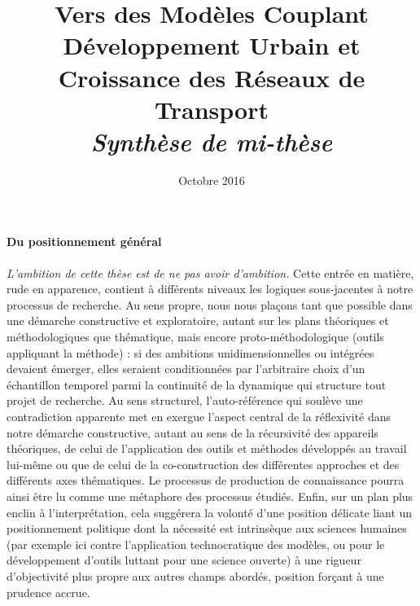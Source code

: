 




\title{Vers des Modèles Couplant Développement Urbain et Croissance des Réseaux de Transport\bigskip\\
\textit{Synthèse de mi-thèse}
}
\author{}
\date{Octobre 2016}


\maketitle

\justify


\begin{abstract}
\end{abstract}






\paragraph{Du positionnement général}

\emph{L'ambition de cette thèse est de ne pas avoir d'ambition.} Cette entrée en matière, rude en apparence, contient à différents niveaux les logiques sous-jacentes à notre processus de recherche. Au sens propre, nous nous plaçons tant que possible dans une démarche constructive et exploratoire, autant sur les plans théoriques et méthodologiques que thématique, mais encore proto-méthodologique (outils appliquant la méthode) : si des ambitions unidimensionnelles ou intégrées devaient émerger, elles seraient conditionnées par l'arbitraire choix d'un échantillon temporel parmi la continuité de la dynamique qui structure tout projet de recherche. Au sens structurel, l'auto-référence qui soulève une contradiction apparente met en exergue l'aspect central de la réflexivité dans notre démarche constructive, autant au sens de la récursivité des appareils théoriques, de celui de l'application des outils et méthodes développés au travail lui-même ou que de celui de la co-construction des différentes approches et des différents axes thématiques. Le processus de production de connaissance pourra ainsi être lu comme une métaphore des processus étudiés. Enfin, sur un plan plus enclin à l'interprétation, cela suggérera la volonté d'une position délicate liant un positionnement politique dont la nécessité est intrinsèque aux sciences humaines (par exemple ici contre l'application technocratique des modèles, ou pour le développement d'outils luttant pour une science ouverte) à une rigueur d'objectivité plus propre aux autres champs abordés, position forçant à une prudence accrue.


